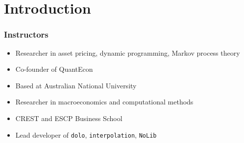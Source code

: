 


\subtitle{Introduction}

\author{John Stachurski}


\date{September 2022}




\begin{frame}
  \titlepage
\end{frame}





\section{Introduction}


\begin{frame}
    \frametitle{Instructors}


    \begin{itemize}
        \item Researcher in asset pricing, dynamic programming, Markov process theory
        \item Co-founder of QuantEcon
        \item Based at Australian National University
    \end{itemize}

        \vspace{0.5em}
        \vspace{0.5em}


    \begin{itemize}
        \item Researcher in macroeconomics and computational methods
        \item CREST and ESCP Business School
        \item Lead developer of \texttt{dolo}, \texttt{interpolation}, \texttt{NoLib}
    \end{itemize}

\end{frame}

